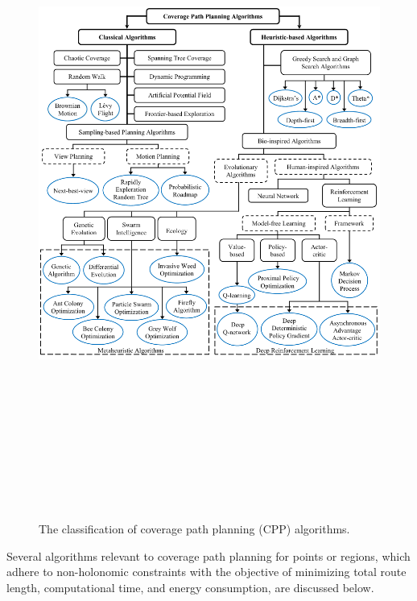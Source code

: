 \begin{figure}[htbp]
    \centering
    \includegraphics[height=22cm, width=\textwidth]{Images/general/general_classification.png}
    \caption{The classification of coverage path planning (CPP) algorithms.}
    \label{fig:classifications_of_CPP}
\end{figure}

\vspace{3mm}

Several algorithms relevant to coverage path planning for points or regions, which adhere to non-holonomic constraints with the objective of minimizing total route length, computational time, and energy consumption, are discussed below.


